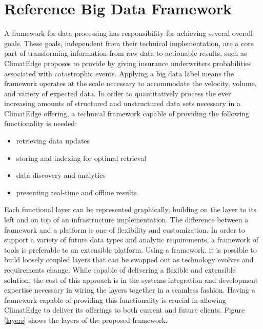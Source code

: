 \section{Reference Big Data Framework}
A framework for data processing has responsibility for achieving several overall goals. These goals, independent from their technical implementation, are a core part of transforming information from raw data to actionable results, such as ClimatEdge proposes to provide by giving insurance underwriters probabilities associated with catastrophic events. Applying a big data label means the framework operates at the scale necessary to accommodate the velocity, volume, and variety of expected data. In order to quantitatively process the ever increasing amounts of structured and unstructured data sets necessary in a ClimatEdge offering, a technical framework capable of providing the following functionality is needed:
\begin{itemize}
	\item retrieving data updates
	\item storing and indexing for optimal retrieval
	\item data discovery and analytics
	\item presenting real-time and offline results
\end{itemize}
Each functional layer can be represented graphically, building on the layer to its left and on top of an infrastructure implementation. The difference between a framework and a platform is one of flexibility and customization. In order to support a variety of future data types and analytic requirements, a framework of tools is preferable to an extensible platform. Using a framework, it is possible to build loosely coupled layers that can be swapped out as technology evolves and requirements change. While capable of delivering a flexible and extensible solution, the cost of this approach is in the systems integration and development expertise necessary in wiring the layers together in a seamless fashion. Having a framework capable of providing this functionality is crucial in allowing ClimatEdge to deliver its offerings to both current and future clients. Figure \ref{layers} shows the layers of the proposed framework.
